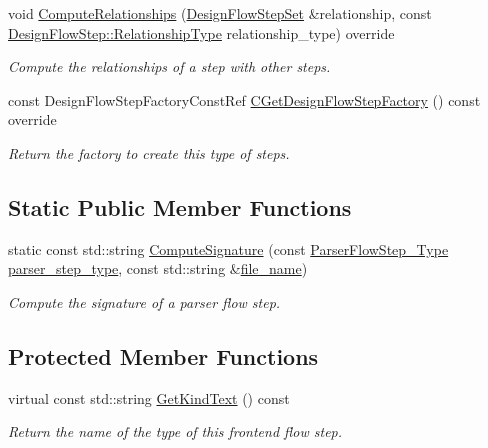 \begin{DoxyCompactItemize}
void \hyperlink{classParserFlowStep_af3cab6d308a30f7d9397d922e34b0a35}{Compute\+Relationships} (\hyperlink{classDesignFlowStepSet}{Design\+Flow\+Step\+Set} \&relationship, const \hyperlink{classDesignFlowStep_a723a3baf19ff2ceb77bc13e099d0b1b7}{Design\+Flow\+Step\+::\+Relationship\+Type} relationship\+\_\+type) override
\begin{DoxyCompactList}\small\item\em Compute the relationships of a step with other steps. \end{DoxyCompactList}\item 
const Design\+Flow\+Step\+Factory\+Const\+Ref \hyperlink{classParserFlowStep_a41edd2518ace1ab135ba83ca630540fa}{C\+Get\+Design\+Flow\+Step\+Factory} () const override
\begin{DoxyCompactList}\small\item\em Return the factory to create this type of steps. \end{DoxyCompactList}\end{DoxyCompactItemize}
\subsection*{Static Public Member Functions}
\begin{DoxyCompactItemize}
\item 
static const std\+::string \hyperlink{classParserFlowStep_ae74f45035340d133b9bddad49ca18653}{Compute\+Signature} (const \hyperlink{parser__flow__step_8hpp_a8e093a5d7a60426e90f01aa6e6a1aa6a}{Parser\+Flow\+Step\+\_\+\+Type} \hyperlink{classParserFlowStep_a69d47e5729f1d625614006fddaefc345}{parser\+\_\+step\+\_\+type}, const std\+::string \&\hyperlink{classParserFlowStep_a728b0a03e63e3529176b848880d12c72}{file\+\_\+name})
\begin{DoxyCompactList}\small\item\em Compute the signature of a parser flow step. \end{DoxyCompactList}\end{DoxyCompactItemize}
\subsection*{Protected Member Functions}
\begin{DoxyCompactItemize}
\item 
virtual const std\+::string \hyperlink{classParserFlowStep_a36b924fdaa571a7581c91586c22a3ff7}{Get\+Kind\+Text} () const
\begin{DoxyCompactList}\small\item\em Return the name of the type of this frontend flow step. \end{DoxyCompactList}\end{DoxyCompactItemize}
